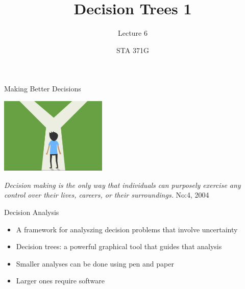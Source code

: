 \documentclass{beamer}\usepackage[]{graphicx}\usepackage[]{color}
\title{Decision Trees 1}
\subtitle{Lecture 6}
\author{STA 371G}
\begin{document}
  
  

  \frame{\maketitle}



  \begin{darkframes}
    
    \begin{frame}{Making Better Decisions}
      \fontsize{10}{10}\selectfont
      \begin{center}
        \includegraphics[width=2in]{DecisionAnalysis.png} \\
      \end{center}
        \textit{Decision making is the only way that individuals can purposely
        exercise any control over their lives, careers, or their surroundings.}
        No:4, 2004
      
      \lc %
    \end{frame}


    \begin{frame}[fragile]{Decision Analysis}
      \begin{itemize}[<+->]
        \item A framework for analyszing decision problems that involve uncertainty
        \item Decision trees: a powerful graphical tool that guides that analysis
        \item Smaller analyses can be done using pen and paper
        \item Larger ones require software 
        \end{itemize} 
    \end{frame}



\end{darkframes}
\end{document}
